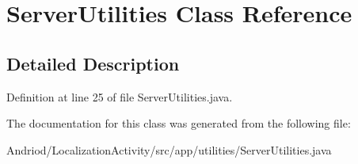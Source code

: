 \hypertarget{classapp_1_1utilities_1_1_server_utilities}{\section{Server\-Utilities Class Reference}
\label{classapp_1_1utilities_1_1_server_utilities}
}


\subsection{Detailed Description}


Definition at line 25 of file Server\-Utilities.\-java.



The documentation for this class was generated from the following file\-:\begin{DoxyCompactItemize}
\item 
Andriod/\-Localization\-Activity/src/app/utilities/Server\-Utilities.\-java\end{DoxyCompactItemize}
